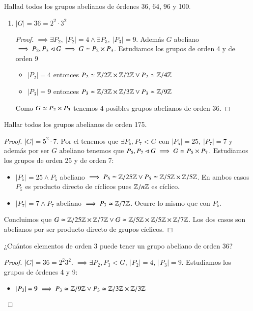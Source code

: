 \begin{ex}[H4.20] Hallad todos los grupos abelianos de órdenes 36, 64, 96 y 100.
	\begin{enumerate}
		\item $|G| = 36 = 2^2\cdot3^2$
		\begin{proof}
			 $\implies \exists P_2,\ |P_2| = 4 \land \exists P_3,\ |P_3| = 9$. Además $G$ abeliano $\implies P_2, P_3 \lhd G \implies G \simeq P_2 \times P_3$. Estudiamos los grupos de orden 4 y de orden 9
			\begin{itemize}
				\item $|P_2| = 4$ entonces $P_2 \simeq \mathbb{Z}/2\mathbb{Z} \times \mathbb{Z}/2\mathbb{Z} \lor P_2 \simeq \mathbb{Z}/4\mathbb{Z}$
				\item $|P_3| = 9$ entonces $P_3 \simeq \mathbb{Z}/3\mathbb{Z} \times \mathbb{Z}/3\mathbb{Z} \lor P_3 \simeq \mathbb{Z}/9\mathbb{Z}$
			\end{itemize}
			Como $G \simeq P_2 \times P_3$ tenemos 4 posibles grupos abelianos de orden 36.
		\end{proof}
	\end{enumerate}
\end{ex}

\begin{ex}[H4.22]
	Hallar todos los grupos abelianos de orden 175.
	
	\begin{proof}
		$|G| = 5^2\cdot 7$. Por el  tenemos que $\exists P_5, P_7 < G$ con $|P_5| = 25,\ |P_7| = 7$ y además por ser $G$ abeliano tenemos que $P_5, P_7 \lhd G \implies G \simeq P_5 \times P_7$. Estudiamos los grupos de orden 25 y de orden 7:
		\begin{itemize}
			\item $|P_5| = 25 \land P_5$ abeliano $\implies P_5 \simeq \mathbb{Z}/25\mathbb{Z} \lor P_5 \simeq \mathbb{Z}/5\mathbb{Z} \times \mathbb{Z}/5\mathbb{Z}$. En ambos casos $P_5$ es producto directo de cíclicos pues $\mathbb{Z}/n\mathbb{Z}$ es cíclico.
			\item $|P_7| = 7 \land P_7$ abeliano $\implies P_7 \simeq \mathbb{Z}/7\mathbb{Z}$. Ocurre lo mismo que con $P_5$.
		\end{itemize}
		Concluimos que $G \simeq \mathbb{Z}/25\mathbb{Z} \times \mathbb{Z}/7\mathbb{Z} \lor G \simeq \mathbb{Z}/5\mathbb{Z} \times \mathbb{Z}/5\mathbb{Z} \times \mathbb{Z}/7\mathbb{Z}$. Los dos casos son abelianos por ser producto directo de grupos cíclicos.
	\end{proof}
\end{ex}

\begin{ex}[H4.23]
	¿Cuántos elementos de orden 3 puede tener un grupo abeliano de orden 36?
	
	\begin{proof}
		$|G| = 36 = 2^2 3^2$.  $\implies \exists P_2, P_3 < G,\ |P_2| = 4,\ |P_3| = 9$. Estudiamos los grupos de órdenes 4 y 9:
		\begin{itemize}
			\item $|P_3| = 9 \implies P_3 \simeq \mathbb{Z}/9\mathbb{Z} \lor P_3 \simeq \mathbb{Z}/3\mathbb{Z} \times \mathbb{Z}/3\mathbb{Z}$
		\end{itemize}
	\end{proof}
\end{ex}